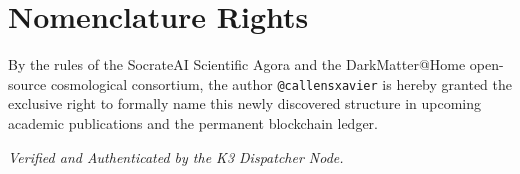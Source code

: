 \documentclass[a4paper,12pt]{article}
\begin{document}
\section*{Nomenclature Rights}
By the rules of the SocrateAI Scientific Agora and the DarkMatter@Home open-source cosmological consortium, the author \texttt{@callensxavier} is hereby granted the exclusive right to formally name this newly discovered structure in upcoming academic publications and the permanent blockchain ledger.

\vspace{2cm}
\begin{flushright}
\textit{Verified and Authenticated by the K3 Dispatcher Node.}
\end{flushright}
\end{document}
